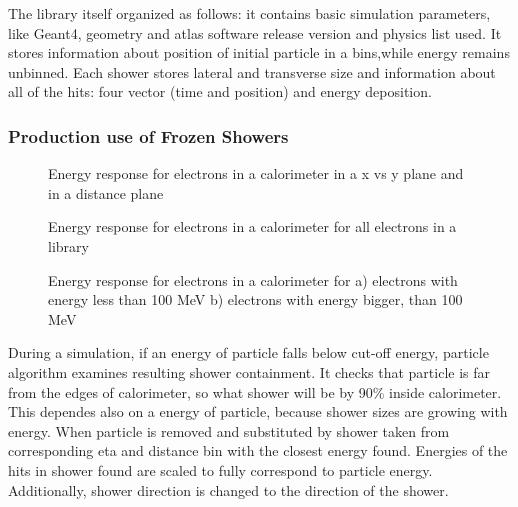The library itself organized as follows: it contains basic simulation parameters, like Geant4, geometry and atlas software release version and physics list used. It stores information about position of initial particle in a bins,while energy remains unbinned. Each shower stores lateral and transverse size and  information about all of the hits: four vector (time and position) and energy deposition. 

\subsubsection{Production use of Frozen Showers}

\begin{figure}
\caption{Energy response for electrons in a calorimeter in a x vs y plane and  in a distance plane }
\label{fig:FSFluctuations}
\end{figure}


\begin{figure}
\caption{Energy response for electrons in a calorimeter for all electrons in a library}
\label{fig:FSProduction}
\end{figure}

\begin{figure}
\begin{minipage}[h]{0.49\linewidth}
\end{minipage}
\hfill
\begin{minipage}[h]{0.49\linewidth}
\end{minipage}
\caption{Energy response for electrons in a calorimeter for  a) electrons with energy less than 100 MeV b) electrons with energy bigger, than 100 MeV}
\label{fig:FSProduction2}
\end{figure}


During a simulation, if an energy of particle falls below cut-off energy, particle algorithm examines resulting shower containment. It checks  that particle is far from the edges of calorimeter, so what shower will be by 90\% inside calorimeter. This dependes also on a energy of particle, because shower sizes are growing with energy.
When particle is removed and substituted by shower taken from corresponding eta and distance bin with the closest energy found. Energies of the hits in shower found are scaled to fully correspond to particle energy. Additionally, shower direction is changed to the direction of the shower.

